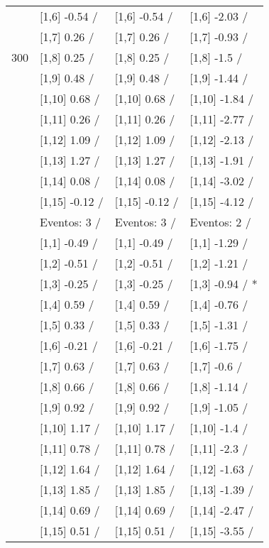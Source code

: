 \begin{table}
\begin{tabular}[t]{llll}
 & {}[1,6] -0.54  / & {}[1,6] -0.54  / & {}[1,6] -2.03  /\\
 & {}[1,7] 0.26  / & {}[1,7] 0.26  / & {}[1,7] -0.93  /\\
300 & {}[1,8] 0.25  / & {}[1,8] 0.25  / & {}[1,8] -1.5  /\\
\addlinespace
 & {}[1,9] 0.48  / & {}[1,9] 0.48  / & {}[1,9] -1.44  /\\
 & {}[1,10] 0.68  / & {}[1,10] 0.68  / & {}[1,10] -1.84  /\\
 & {}[1,11] 0.26  / & {}[1,11] 0.26  / & {}[1,11] -2.77  /\\
 & {}[1,12] 1.09  / & {}[1,12] 1.09  / & {}[1,12] -2.13  /\\
 & {}[1,13] 1.27  / & {}[1,13] 1.27  / & {}[1,13] -1.91  /\\
\addlinespace
 & {}[1,14] 0.08  / & {}[1,14] 0.08  / & {}[1,14] -3.02  /\\
 & {}[1,15] -0.12  / & {}[1,15] -0.12  / & {}[1,15] -4.12  /\\
 & Eventos:  3 / & Eventos:  3 / & Eventos:  2 /\\
 & {}[1,1] -0.49  / & {}[1,1] -0.49  / & {}[1,1] -1.29  /\\
 & {}[1,2] -0.51  / & {}[1,2] -0.51  / & {}[1,2] -1.21  /\\
\addlinespace
 & {}[1,3] -0.25  / & {}[1,3] -0.25  / & {}[1,3] -0.94  / *\\
 & {}[1,4] 0.59  / & {}[1,4] 0.59  / & {}[1,4] -0.76  /\\
 & {}[1,5] 0.33  / & {}[1,5] 0.33  / & {}[1,5] -1.31  /\\
 & {}[1,6] -0.21  / & {}[1,6] -0.21  / & {}[1,6] -1.75  /\\
 & {}[1,7] 0.63  / & {}[1,7] 0.63  / & {}[1,7] -0.6  /\\
\addlinespace
500 & {}[1,8] 0.66  / & {}[1,8] 0.66  / & {}[1,8] -1.14  /\\
 & {}[1,9] 0.92  / & {}[1,9] 0.92  / & {}[1,9] -1.05  /\\
 & {}[1,10] 1.17  / & {}[1,10] 1.17  / & {}[1,10] -1.4  /\\
 & {}[1,11] 0.78  / & {}[1,11] 0.78  / & {}[1,11] -2.3  /\\
 & {}[1,12] 1.64  / & {}[1,12] 1.64  / & {}[1,12] -1.63  /\\
\addlinespace
 & {}[1,13] 1.85  / & {}[1,13] 1.85  / & {}[1,13] -1.39  /\\
 & {}[1,14] 0.69  / & {}[1,14] 0.69  / & {}[1,14] -2.47  /\\
 & {}[1,15] 0.51  / & {}[1,15] 0.51  / & {}[1,15] -3.55  /\\
\bottomrule
\end{tabular}
\end{table}
